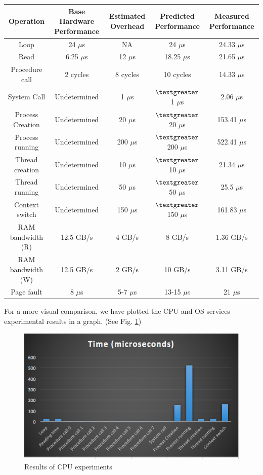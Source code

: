 \documentclass[conference]{IEEEtran}
\begin{document}
\begin{center}
\begin{tabular} { |c|c|c|c|c| } 
  \hline
  \textbf{Operation} & \textbf{Base Hardware Performance} & \textbf{Estimated Overhead} & \textbf{Predicted Performance} & \textbf{Measured Performance} \\
  \hline
  Loop & 24 $\mu$s & NA & 24 $\mu$s & 24.33 $\mu$s \\
  \hline
  Read & 6.25 $\mu$s & 12 $\mu$s & 18.25 $\mu$s & 21.65 $\mu$s \\
  \hline
  Procedure call  & 2 cycles & 8 cycles & 10 cycles & 14.33 $\mu$s \\
  \hline
  System Call & Undetermined & 1 $\mu$s & $\textgreater$1 $\mu$s & 2.06 $\mu$s \\
  \hline
  Process Creation & Undetermined & 20 $\mu$s & $\textgreater$20 $\mu$s & 153.41 $\mu$s \\
  \hline
  Process running & Undetermined & 200 $\mu$s & $\textgreater$200 $\mu$s & 522.41 $\mu$s \\
  \hline
  Thread creation & Undetermined & 10 $\mu$s & $\textgreater$10 $\mu$s & 21.34 $\mu$s \\
  \hline
  Thread running & Undetermined & 50 $\mu$s & $\textgreater$50 $\mu$s & 25.5 $\mu$s \\
  \hline
  Context switch & Undetermined & 150 $\mu$s & $\textgreater$150 $\mu$s & 161.83 $\mu$s \\
  \hline
  RAM bandwidth (R) & 12.5 GB/s & 4 GB/s & 8 GB/s & 1.36 GB/s \\
  \hline
  RAM bandwidth (W) & 12.5 GB/s & 2 GB/s & 10 GB/s & 3.11 GB/s \\
  \hline
  Page fault & 8 $\mu$s & 5-7 $\mu$s & 13-15 $\mu$s & 21 $\mu$s \\
  \hline
  
\end{tabular}
\end{center}

For a more visual comparison, we have plotted the CPU and OS services experimental results in a graph. (See Fig. \ref{fig:graph1})

\begin{figure}[h]
\centering
\includegraphics[scale=0.5]{graph1.png}
\caption{Results of CPU experiments}
\label{fig:graph1}
\end{figure}
\end{document}
